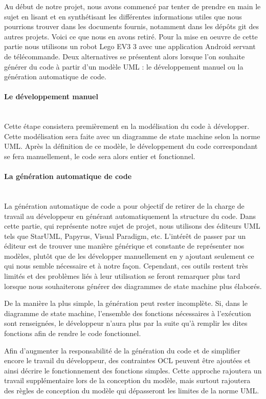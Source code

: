 \documentclass[french, 12pt, a4paper]{article}
\newcommand{\myparagraph}[1]{\paragraph{#1}\mbox{}\\}
\begin{document}
Au début de notre projet, nous avons commencé par tenter de prendre en main le sujet en lisant et en synthétisant les différentes informations utiles que nous pourrions trouver dans les documents fournis, notamment dans les dépôts git des autres projets. Voici ce que nous en avons retiré. 
\newline
\newline
Pour la mise en oeuvre de cette partie nous utilisons un robot Lego EV3 3 avec une application Android servant de télécommande. Deux alternatives se présentent alors  lorsque l'on souhaite générer du code à partir d'un modèle UML : le développement manuel ou la génération automatique de code.

\myparagraph{Le développement manuel}

Cette étape consistera premièrement en la modélisation du code à développer. Cette modélisation sera faite avec un diagramme de state machine selon la norme UML. Après la définition de ce modèle, le développement du code correspondant se fera manuellement, le code sera alors entier et fonctionnel.

\myparagraph{La génération automatique de code}

La génération automatique de code a pour objectif de retirer de la charge de travail au développeur en générant automatiquement la structure du code. 
Dans cette partie, qui représente notre sujet de projet, nous utilisons des éditeurs UML tels que StarUML, Papyrus, Visual Paradigm, etc. 
L'intérêt de passer par un éditeur est de trouver une manière générique et constante de représenter nos modèles, plutôt que de les développer manuellement en y ajoutant seulement ce qui nous semble nécessaire et à notre façon. Cependant, ces outils restent très limités et des problèmes liés à leur utilisation se feront remarquer plus tard lorsque nous souhaiterons générer des diagrammes de state machine plus élaborés.

De la manière la plus simple, la génération peut rester incomplète. Si, dans le diagramme de state machine, l'ensemble des fonctions nécessaires à l'exécution sont renseignées, le développeur n'aura plus par la suite qu'à remplir les dites fonctions afin de rendre le code fonctionnel.

Afin d'augmenter la responsabilité de la génération du code et de simplifier encore le travail du développeur, des contraintes OCL peuvent être ajoutées et ainsi décrire le fonctionnement des fonctions simples. Cette approche rajoutera un travail supplémentaire lors de la conception du modèle, mais surtout rajoutera des règles de conception du modèle qui dépasseront les limites de la norme UML.
\end{document}
